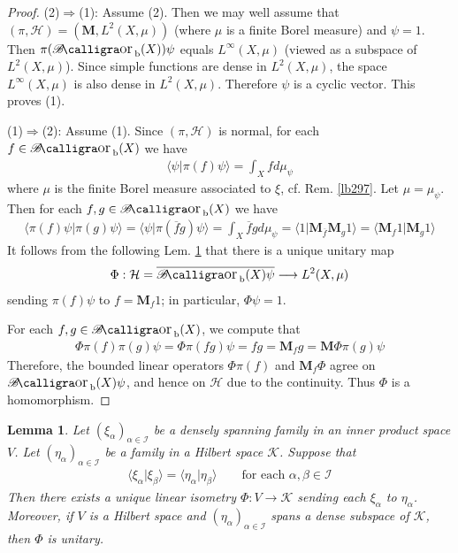\documentclass[12pt,b5paper,notitlepage]{article}
\theoremstyle{definition}
\theoremstyle{plain}
\newtheorem{lm}[df]{Lemma}
\DeclareMathOperator{\Borb}{{\mathscr{B}\text{\kern -2pt {\calligra\large or}}\,}_{\mathrm b}}
\newcommand{\ovl}{\overline}
\newcommand{\bk}[1]{\langle {#1}\rangle}
\newcommand{\MH}{\mathcal H}
\newcommand{\MK}{\mathcal K}
\newcommand{\SI}{\mathscr I}
\newcommand{\Mbf}{\mathbf M}
\numberwithin{equation}{section}
\begin{document}
\begin{proof}
(2)$\Rightarrow$(1): Assume (2). Then we may well assume that $(\pi,\MH)=(\Mbf,L^2(X,\mu))$ (where $\mu$ is a finite Borel measure) and $\psi=1$. Then $\pi(\Borb(X))\psi$ equals $L^\infty(X,\mu)$ (viewed as a subspace of $L^2(X,\mu)$). Since simple functions are dense in $L^2(X,\mu)$, the space $L^\infty(X,\mu)$ is also dense in $L^2(X,\mu)$. Therefore $\psi$ is a cyclic vector. This proves (1).

(1)$\Rightarrow$(2): Assume (1). Since $(\pi,\MH)$ is normal, for each $f\in\Borb(X)$ we have
\begin{align*}
\bk{\psi|\pi(f)\psi}=\int_X fd\mu_\psi
\end{align*}
where $\mu$ is the finite Borel measure associated to $\xi$, cf. Rem. \ref{lb297}. Let $\mu=\mu_\psi$. Then for each $f,g\in\Borb(X)$ we have
\begin{align}\label{eq180}
\bk{\pi(f)\psi|\pi(g)\psi}=\bk{\psi|\pi(\ovl fg)\psi}=\int_X\ovl fgd\mu_\psi=\bk{1|\Mbf_{\ovl f}\Mbf_g1}=\bk{\Mbf_f1|\Mbf_g1}
\end{align}
It follows from the following Lem. \ref{lb368} that there is a unique unitary map
\begin{align*}
\Phi:\MH=\ovl{\Borb(X)\psi}\longrightarrow L^2(X,\mu)
\end{align*}
sending $\pi(f)\psi$ to $f=\Mbf_f1$; in particular, $\Phi\psi=1$.

For each $f,g\in\Borb(X)$, we compute that
\begin{align*}
\Phi\pi(f)\pi(g)\psi=\Phi\pi(fg)\psi=fg=\Mbf_fg=\Mbf\Phi \pi(g)\psi
\end{align*}
Therefore, the bounded linear operators $\Phi\pi(f)$ and $\Mbf_f\Phi$ agree on $\Borb(X)\psi$, and hence on $\MH$ due to the continuity. Thus $\Phi$ is a homomorphism.
\end{proof}


\begin{lm}\label{lb368}
Let $(\xi_\alpha)_{\alpha\in\SI}$ be a densely spanning family in an inner product space $V$. Let $(\eta_\alpha)_{\alpha\in\SI}$ be a family in a Hilbert space $\MK$. Suppose that
\begin{align}\label{eq189}
\bk{\xi_\alpha|\xi_\beta}=\bk{\eta_\alpha|\eta_\beta}\qquad\text{for each }\alpha,\beta\in\SI
\end{align}
Then there exists a unique linear isometry $\Phi:V\rightarrow \MK$ sending each $\xi_\alpha$ to $\eta_\alpha$. Moreover, if $V$ is a Hilbert space and $(\eta_\alpha)_{\alpha\in\SI}$ spans a dense subspace of $\MK$, then $\Phi$ is unitary.
\end{lm}
\end{document}
